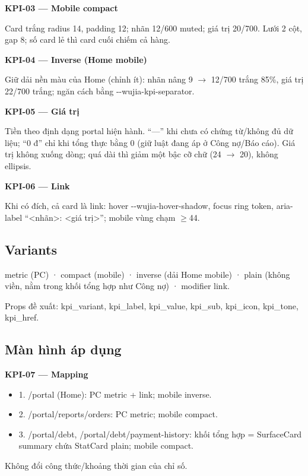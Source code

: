 \documentclass[11pt,a4paper]{report}
\begin{document}
\par\smallskip\textbf{KPI-03 — Mobile compact}\par
Card trắng radius 14, padding 12; nhãn 12/\allowbreak{}600 muted; giá trị 20/\allowbreak{}700. Lưới 2 cột, gap 8; số card lẻ thì card cuối chiếm cả hàng.\par

\par\smallskip\textbf{KPI-04 — Inverse (Home mobile)}\par
Giữ dải nền màu của Home (chỉnh ít): nhãn nâng 9 \(\to\) 12/\allowbreak{}700 trắng 85\%, giá trị 22/\allowbreak{}700 trắng; ngăn cách bằng -\kern0pt-\allowbreak{}wujia-\allowbreak{}kpi-\allowbreak{}separator.\par

\par\smallskip\textbf{KPI-05 — Giá trị}\par
Tiền theo định dạng portal hiện hành. “—” khi chưa có chứng từ/\allowbreak{}không đủ dữ liệu; “0 đ” chỉ khi tổng thực bằng 0 (giữ luật đang áp ở Công nợ/\allowbreak{}Báo cáo). Giá trị không xuống dòng; quá dài thì giảm một bậc cỡ chữ (24 \(\to\) 20), không ellipsis.\par

\par\smallskip\textbf{KPI-06 — Link}\par
Khi có đích, cả card là link: hover -\kern0pt-\allowbreak{}wujia-\allowbreak{}hover-\allowbreak{}shadow, focus ring token, aria-\allowbreak{}label “\textless{}nhãn\textgreater{}: \textless{}giá trị\textgreater{}”; mobile vùng chạm \(\geq\)44.\par
\subsection*{Variants}
metric (PC) · compact (mobile) · inverse (dải Home mobile) · plain (không viền, nằm trong khối tổng hợp như Công nợ) · modifier link.\par
Props đề xuất: kpi\_variant, kpi\_label, kpi\_value, kpi\_sub, kpi\_icon, kpi\_tone, kpi\_href.\par
\subsection*{Màn hình áp dụng}
\par\smallskip\textbf{KPI-07 — Mapping}\par
\begin{itemize}[label={}]
\item 1. /portal (Home): PC metric + link; mobile inverse.
\item 2. /portal/\allowbreak{}reports/\allowbreak{}orders: PC metric; mobile compact.
\item 3. /portal/\allowbreak{}debt, /portal/\allowbreak{}debt/\allowbreak{}payment-\allowbreak{}history: khối tổng hợp = SurfaceCard summary chứa StatCard plain; mobile compact.
\end{itemize}
Không đổi công thức/\allowbreak{}khoảng thời gian của chỉ số.\par
\end{document}

